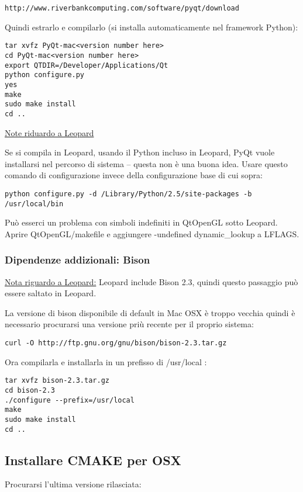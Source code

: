 \begin{verbatim}
http://www.riverbankcomputing.com/software/pyqt/download
\end{verbatim}

Quindi estrarlo e compilarlo (si installa automaticamente nel framework Python):

\begin{verbatim}
tar xvfz PyQt-mac<version number here>
cd PyQt-mac<version number here>
export QTDIR=/Developer/Applications/Qt
python configure.py 
yes 
make 
sudo make install 
cd ..  
\end{verbatim}

\underline{Note riduardo a Leopard}

Se si compila in Leopard, usando il Python incluso in Leopard, PyQt vuole installarsi nel percorso di sistema -- questa non è una buona idea.  Usare questo comando di configurazione invece della configurazione base di cui sopra:

\begin{verbatim}
python configure.py -d /Library/Python/2.5/site-packages -b /usr/local/bin
\end{verbatim}

Può esserci un problema con simboli indefiniti in QtOpenGL sotto Leopard.  Aprire QtOpenGL/makefile e aggiungere -undefined dynamic\_lookup a LFLAGS.

\subsubsection{Dipendenze addizionali: Bison}
\underline{Nota riguardo a Leopard:} Leopard include Bison 2.3, quindi questo passaggio può essere saltato in Leopard.

La versione di bison disponibile di default in Mac OSX è troppo vecchia quindi è necessario procurarsi una versione priù recente per il proprio sistema:

\begin{verbatim}
curl -O http://ftp.gnu.org/gnu/bison/bison-2.3.tar.gz 
\end{verbatim}

Ora compilarla e installarla in un prefisso di /usr/local :

\begin{verbatim}
tar xvfz bison-2.3.tar.gz 
cd bison-2.3 
./configure --prefix=/usr/local 
make
sudo make install 
cd ..  
\end{verbatim}

\subsection{Installare CMAKE per OSX}
Procurarsi l'ultima versione rilasciata:

